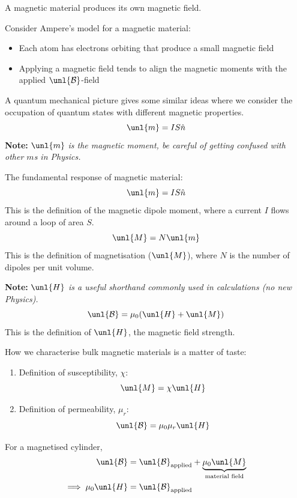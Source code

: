 \documentclass[a4paper, 11pt, normalem]{report}
\newcommand\B{\mathcal{B}}
\newcommand\uB{\unl{\B}}
\newcommand\hn{\hat{n}}
\begin{document}
A magnetic material produces its own magnetic field.

Consider Ampere's model for a magnetic material:
\begin{itemize}
    \item Each atom has electrons orbiting that produce a small magnetic field
    \item Applying a magnetic field tends to align the magnetic moments with the applied $\uB$-field
\end{itemize}
A quantum mechanical picture gives some similar ideas where we consider the occupation of quantum states with different magnetic properties.
\begin{equation}
    \unl{m} = IS\hn
\end{equation}
\textbf{Note:} \textit{$\unl{m}$ is the magnetic moment, be careful of getting confused with other $m$s in Physics.}

The fundamental response of magnetic material:
\begin{equation}
    \unl{m} = IS\hn
\end{equation}
This is the definition of the magnetic dipole moment, where a current $I$ flows around a loop of area $S$.
\begin{equation}
    \unl{M} = N\unl{m}
\end{equation}
This is the definition of magnetisation ($\unl{M}$), where $N$ is the number of dipoles per unit volume.

\textbf{Note:} \textit{$\unl{H}$ is a useful shorthand commonly used in calculations (no new Physics).}
\begin{equation}
    \uB = \mu_0(\unl{H} + \unl{M})
\end{equation}
This is the definition of $\unl{H}$, the magnetic field strength.

How we characterise bulk magnetic materials is a matter of taste:
\begin{enumerate}
    \item Definition of susceptibility, $\chi$:
    \begin{equation}
        \unl{M} = \chi \unl{H}
    \end{equation}
    \item Definition of permeability, $\mu_r$:
    \begin{equation}
        \uB = \mu_0\mu_r\unl{H}
    \end{equation}
\end{enumerate}
For a magnetised cylinder,
\begin{align}
    \uB &= \uB_{\text{applied}} + \underbrace{\mu_0\unl{M}}_{\text{material field}} \\
    \implies \mu_0\unl{H} &= \uB_{\text{applied}}
\end{align}
\end{document}
